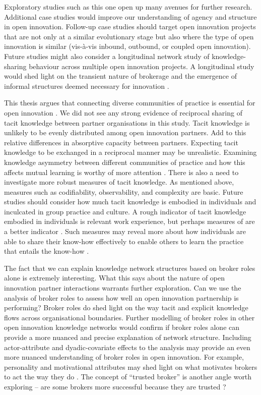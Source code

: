 Exploratory studies such as this one open up many avenues for further research. Additional case studies would improve our understanding of agency and structure in open innovation. Follow-up case studies should target open innovation projects that are not only at a similar evolutionary stage but also where the type of open innovation is similar (vis-\`a-vis inbound, outbound, or coupled open innovation). Future studies might also consider a longitudinal network study of knowledge-sharing behaviour across multiple open innovation projects. A longitudinal study would shed light on the transient nature of brokerage and the emergence of informal structures deemed necessary for innovation \citep{quintane2021temporal}.  \medskip

This thesis argues that connecting diverse communities of practice is essential for open innovation \citep{brown2001knowledge}. We did not see any strong evidence of reciprocal sharing of tacit knowledge between partner organisations in this study. Tacit knowledge is unlikely to be evenly distributed among open innovation partners. Add to this relative differences in absorptive capacity between partners. Expecting tacit knowledge to be exchanged in a reciprocal manner may be unrealistic. Examining knowledge asymmetry between different communities of practice and how this affects mutual learning is worthy of more attention \citep{liu2021more}. There is also a need to investigate more robust measures of tacit knowledge. As mentioned above, measures such as codifiability, observability, and complexity are basic. Future studies should consider how much tacit knowledge is embodied in individuals and inculcated in group practice and culture. A rough indicator of tacit knowledge embodied in individuals is relevant work experience, but perhaps measures of  are a better indicator \citep{hedlund2002tacit}. Such measures may reveal more about how individuals are able to share their know-how effectively to enable others to learn the practice that entails the know-how \citep{van1986central, cook1999bridging}. \medskip 

The fact that we can explain knowledge network structures based on broker roles alone is extremely interesting. What this says about the nature of open innovation partner interactions warrants further exploration. Can we use the analysis of broker roles to assess how well an open innovation partnership is performing? Broker roles do shed light on the way tacit and explicit knowledge flows across organisational boundaries. Further modelling of broker roles in other open innovation knowledge networks would confirm if broker roles alone can provide a more nuanced and precise explanation of network structure. Including actor-attribute and dyadic-covariate effects to the analysis may provide an even more nuanced understanding of broker roles in open innovation. For example, personality and motivational attributes may shed light on what motivates brokers to act the way they do \citep{davis2010agency}. The concept of \enquote{trusted broker} is another angle worth exploring -- are some brokers more successful because they are trusted \citep{long2013bridges,kwon2020network}? 

